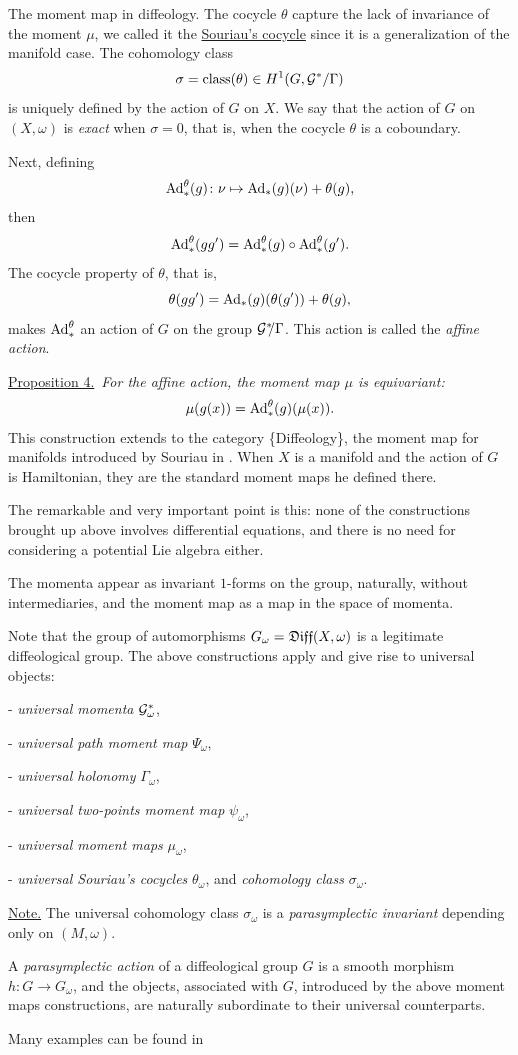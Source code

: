 \begin{Article}{The moment map in diffeology.}{}
{  The cocycle $\theta$ capture the lack of invariance of the moment $\mu$,
  we called it the \uline{Souriau's cocycle} since it is a generalization of the manifold case.
  The cohomology class
  $$%
    \sigma = \Class(\theta) \in H^1(G, \cG^*/\Gamma)
    $$%
  is uniquely defined by the action of $G$ on $X$.
  We say that the action of $G$ on $(X,\omega)$ is \emph{exact} when $\sigma = 0$,
  that is,
  when the cocycle $\theta$ is a coboundary.
  }
  
  Next,
  defining
  $$%
    \Ad_*^\theta (g) \colon \nu \mapsto \Ad_*(g)(\nu) + \theta(g),
    $$%
  then
  $$%
    \Ad_*^\theta (gg') = \Ad_*^\theta (g) \circ \Ad_*^\theta (g').
    $$%
  The cocycle property of $\theta$,
  that is,
  $$%
    \theta(gg') = \Ad_*(g)(\theta(g')) + \theta(g),
    $$%
  makes $\mathrm{Ad}_*^\theta$ an action of $G$ on the group $\mathcal{G}^*\!\!/\Gamma$.
  This action is called the \emph{affine action}.
  
  \uline{Proposition 4.}~{\itshape For the affine action,
  the moment map $\mu$ is equivariant:}
  $$%
    \mu(g(x))= \Ad_*^\theta(g)(\mu(x)).
    $$%
  This construction extends to the category \{Diffeology\},
  the moment map for manifolds introduced by Souriau in \cite{Sou70}.
  When $X$ is a manifold and the action of $G$ is Hamiltonian,
  they are the standard moment maps he defined there.
  
  The remarkable and very important point is this:
  none of the constructions brought up above involves differential equations,
  and there is no need for considering a potential Lie algebra either.
  
  The momenta appear as invariant $1$-forms on the group,
  naturally,
  without intermediaries,
  and the moment map as a map in the space of momenta.
  
  Note that the group of automorphisms $G_\omega = \mathfrak{Diff}(X,\omega)$ is a legitimate diffeological group.
  The above constructions apply and give rise to universal objects:
  
  - \emph{universal momenta} $\mathcal{G}_\omega^*$,
  
  - \emph{universal path moment map} $\Psi_\omega$,
  
  - \emph{universal holonomy} $\Gamma_\omega$,
  
  - \emph{universal two-points moment map} $\psi_\omega$,
  
  - \emph{universal moment maps} $\mu_\omega$,
  
  - \emph{universal Souriau's cocycles} $\theta_\omega$,
  and \emph{cohomology class} $\sigma_\omega$.
  
  \uline{Note.} The universal cohomology class $\sigma_\omega$ is a \emph{parasymplectic invariant} depending only on $(M,\omega)$.
  
  A \emph{parasymplectic action} of a diffeological group $G$ is a smooth morphism $h \colon G \to G_\omega$,
  and the objects,
  associated with $G$,
  introduced by the above moment maps constructions,
  are naturally subordinate to their universal counterparts.
  
  Many examples can be found in \cite[Sections 9.27~--~9.34]{PIZ13}
\end{Article}

